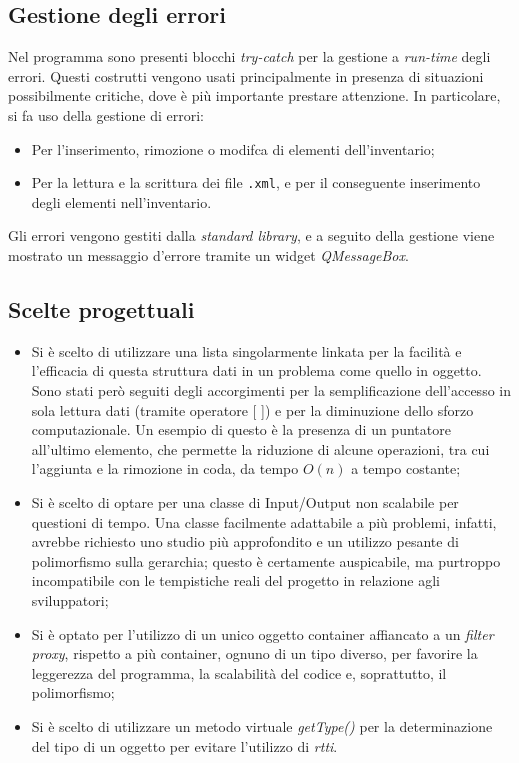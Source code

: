 \subsection{Gestione degli errori}
Nel programma sono presenti blocchi \textit{try-catch} per la gestione a \textit{run-time} degli errori. Questi costrutti vengono usati principalmente in presenza di situazioni possibilmente critiche, dove è più importante prestare attenzione. In particolare, si fa uso della gestione di errori:
\begin{itemize}
  \item Per l'inserimento, rimozione o modifca di elementi dell'inventario;
  \item Per la lettura e la scrittura dei file \texttt{.xml}, e per il conseguente inserimento degli elementi nell'inventario.
\end{itemize}
Gli errori vengono gestiti dalla \textit{standard library}, e a seguito della gestione viene mostrato un messaggio d'errore tramite un widget \textit{QMessageBox}.


\subsection{Scelte progettuali}
\begin{itemize}
\item Si è scelto di utilizzare una lista singolarmente linkata per la facilità e l'efficacia di questa struttura dati in un problema come quello in oggetto. Sono stati però seguiti degli accorgimenti per la semplificazione dell'accesso in sola lettura dati (tramite operatore [ ]) e per la diminuzione dello sforzo computazionale. Un esempio di questo è la presenza di un puntatore all'ultimo elemento, che permette la riduzione di alcune operazioni, tra cui l'aggiunta e la rimozione in coda, da tempo $O(n)$ a tempo costante;
\item Si è scelto di optare per una classe di Input/Output non scalabile per questioni di tempo. Una classe facilmente adattabile a più problemi, infatti, avrebbe richiesto uno studio più approfondito e un utilizzo pesante di polimorfismo sulla gerarchia; questo è certamente auspicabile, ma purtroppo incompatibile con le tempistiche reali del progetto in relazione agli sviluppatori;
\item Si è optato per l'utilizzo di un unico oggetto container affiancato a un \textit{filter proxy}, rispetto a più container, ognuno di un tipo diverso, per favorire la leggerezza del programma, la scalabilità del codice e, soprattutto, il polimorfismo;
\item Si è scelto di utilizzare un metodo virtuale \textit{getType()} per la determinazione del tipo di un oggetto per evitare l'utilizzo di \textit{rtti}.
\end{itemize}

